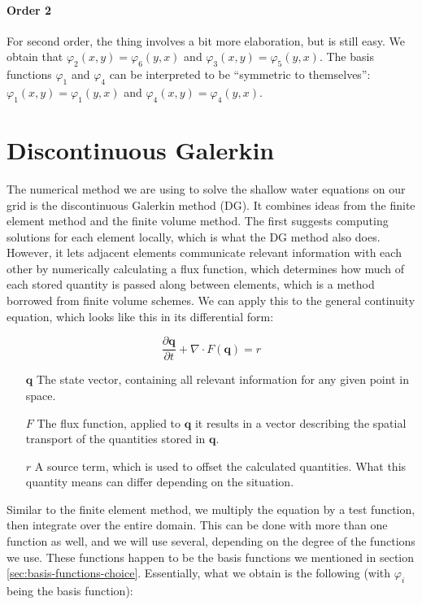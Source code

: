 \documentclass{article}
\newcommand{\pd}[2]{\dfrac{\partial #1}{\partial #2}}
\renewcommand{\phi}{\varphi}
\begin{document}
\paragraph{Order 2}

For second order, the thing involves a bit more elaboration, but is still easy. We obtain that $\phi_2(x,y)=\phi_6(y,x)$ and $\phi_3(x,y)=\phi_5(y,x)$. The basis functions $\phi_1$ and $\phi_4$ can be interpreted to be ``symmetric to themselves'': $\phi_1(x,y)=\phi_1(y,x)$ and $\phi_4(x,y)=\phi_4(y,x)$.

\section{Discontinuous Galerkin}
\label{sec:discontinuous-galerkin}

The numerical method we are using to solve the shallow water equations on our grid is the discontinuous Galerkin method (DG). It combines ideas from the finite element method and the finite volume method. The first suggests computing solutions for each element locally, which is what the DG method also does. However, it lets adjacent elements communicate relevant information with each other by numerically calculating a flux function, which determines how much of each stored quantity is passed along between elements, which is a method borrowed from finite volume schemes. We can apply this to the general continuity equation, which looks like this in its differential form:

\begin{equation}
  \label{eq:general-continuity-equation}
  \pd{\mathbf{q}}{t} + \nabla \cdot F(\mathbf{q}) = r
\end{equation}

\begin{itemize}
\item[$\mathbf{q}$] The state vector, containing all relevant information for any given point in space.
\item[$F$] The flux function, applied to $\mathbf{q}$ it results in a vector describing the spatial transport of the quantities stored in $\mathbf{q}$.
\item[$r$] A source term, which is used to offset the calculated quantities. What this quantity means can differ depending on the situation.
\end{itemize}

Similar to the finite element method, we multiply the equation by a test function, then integrate over the entire domain. This can be done with more than one function as well, and we will use several, depending on the degree of the functions we use. These functions happen to be the basis functions we mentioned in section \ref{sec:basis-functions-choice}. Essentially, what we obtain is the following (with $\phi_i$ being the basis function):
\end{document}
